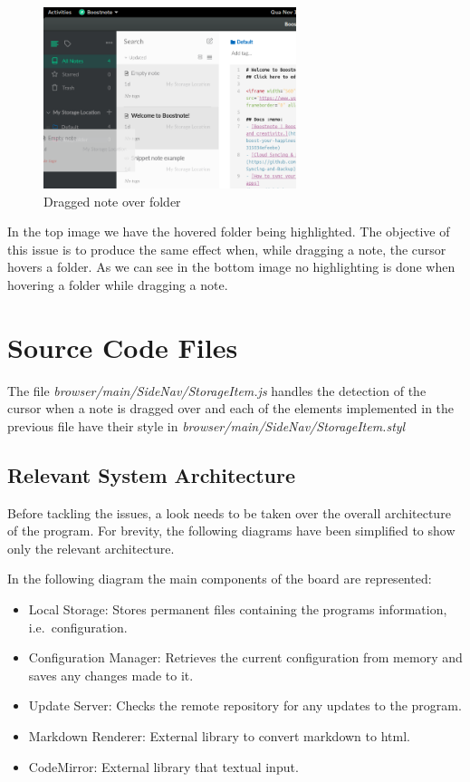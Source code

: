 \begin{figure}
\centering
\includegraphics[height=2.08333in]{../hoveredWithNoteEx.png}
\caption{Dragged note over folder}
\end{figure}

In the top image we have the hovered folder being highlighted. The
objective of this issue is to produce the same effect when, while
dragging a note, the cursor hovers a folder. As we can see in the bottom
image no highlighting is done when hovering a folder while dragging a
note.

\section{Source Code Files}\label{source-code-files-1}

The file \emph{browser/main/SideNav/StorageItem.js} handles the
detection of the cursor when a note is dragged over and each of the
elements implemented in the previous file have their style in
\emph{browser/main/SideNav/StorageItem.styl}

\subsection{Relevant System
Architecture}\label{relevant-system-architecture-1}

Before tackling the issues, a look needs to be taken over the overall
architecture of the program. For brevity, the following diagrams have
been simplified to show only the relevant architecture.

In the following diagram the main components of the board are
represented:

\begin{itemize}
\item
  Local Storage: Stores permanent files containing the programs
  information, i.e.~configuration.
\item
  Configuration Manager: Retrieves the current configuration from memory
  and saves any changes made to it.
\item
  Update Server: Checks the remote repository for any updates to the
  program.
\item
  Markdown Renderer: External library to convert markdown to html.
\item
  CodeMirror: External library that textual input.
\end{itemize}

